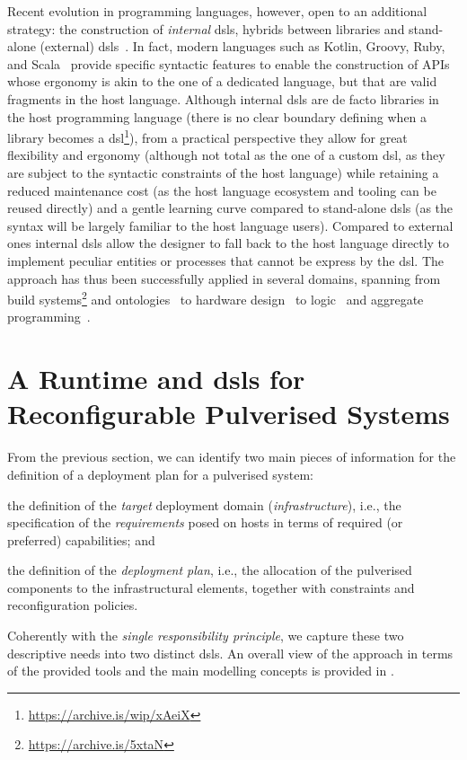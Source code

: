 \documentclass[conference]{IEEEtran}
\begin{document}
Recent evolution in programming languages,
however,
open to an additional strategy:
the construction of \emph{internal} \acp{dsl},
hybrids between libraries and stand-alone (external) \acp{dsl}~\cite{dsl-book-voelter}.
%
In fact, modern languages such as Kotlin, Groovy, Ruby, and Scala~\cite{Riti2018}
provide specific syntactic features to enable the construction of APIs whose ergonomy is akin to the one of a dedicated language,
but that are valid fragments in the host language.
%
Although internal \acp{dsl} are de facto libraries in the host programming language
(there is no clear boundary defining when a library becomes a \ac{dsl}\footnote{\url{https://archive.is/wip/xAeiX}}),
from a practical perspective
they allow for great flexibility and ergonomy
(although not total as the one of a custom \ac{dsl}, as they are subject to the syntactic constraints of the host language)
while retaining a reduced maintenance cost
(as the host language ecosystem and tooling can be reused directly)
and a gentle learning curve compared to stand-alone \acp{dsl}
(as the syntax will be largely familiar to the host language users).
%
Compared to external ones
internal \acp{dsl} allow the designer to fall back to the host language directly
to implement peculiar entities or processes that cannot be express by the \ac{dsl}.
%
The approach has thus been successfully applied in several domains,
spanning from
build systems\footnote{\url{https://archive.is/5xtaN}}
and ontologies~\cite{DBLP:journals/jossw/Balhoff16} to
hardware design~\cite{DBLP:journals/trets/SerreP20} to
logic~\cite{2pkt-swx16} and aggregate programming~\cite{DBLP:journals/softx/CasadeiVAP22}.
%

\section{A Runtime and \acsp{dsl} for Reconfigurable Pulverised Systems}\label{sec:contribution}

From the previous section,
we can identify two main pieces of information for the definition of a deployment plan for a pulverised system:
\begin{enumerate*}[label=\it{(\roman*)}]
  \item the definition of the \emph{target} deployment domain (\emph{infrastructure}), i.e., the specification of the \emph{requirements} posed on hosts in terms of required (or preferred) capabilities; and
  \item the definition of the \emph{deployment plan}, i.e., the allocation of the pulverised components to the infrastructural elements, together with constraints and reconfiguration policies.
\end{enumerate*}
%
Coherently with the \emph{single responsibility principle},
we capture these two descriptive needs into two distinct \acp{dsl}.
%
An overall view of the approach in terms of the provided tools and the main modelling concepts is provided in .
\end{document}
